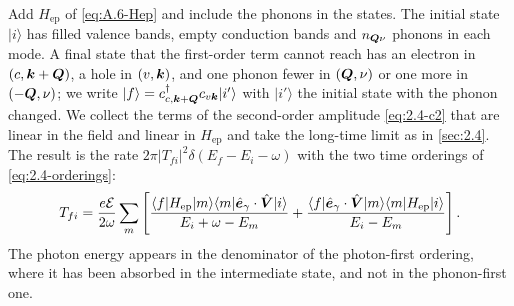 Add $H_{\mathrm{ep}}$ of \cref{eq:A.6-Hep} and include the phonons in the states. The initial state $|i\rangle$ has filled valence bands, empty conduction bands and $n_{\bm{Q}\nu}$ phonons in each mode. A final state that the first-order term cannot reach has an electron in $(c,\bm{k}+\bm{Q})$, a hole in $(v,\bm{k})$, and one phonon fewer in $(\bm{Q},\nu)$ or one more in $(-\bm{Q},\nu)$; we write $|f\rangle = c^\dagger_{c,\bm{k}+\bm{Q}}c_{v\bm{k}}|i'\rangle$ with $|i'\rangle$ the initial state with the phonon changed. We collect the terms of the second-order amplitude \cref{eq:2.4-c2} that are linear in the field and linear in $H_{\mathrm{ep}}$ and take the long-time limit as in \cref{sec:2.4}. The result is the rate $2\pi|T_{fi}|^2\delta(E_f - E_i - \omega)$ with the two time orderings of \cref{eq:2.4-orderings}:
\begin{equation*}
  T_{fi} = \frac{e\mathcal{E}}{2\omega}\sum_m\left[\frac{\langle f|H_{\mathrm{ep}}|m\rangle\langle m|\hat{\bm{e}}_\gamma\cdot\hat{\bm{V}}|i\rangle}{E_i + \omega - E_m} + \frac{\langle f|\hat{\bm{e}}_\gamma\cdot\hat{\bm{V}}|m\rangle\langle m|H_{\mathrm{ep}}|i\rangle}{E_i - E_m}\right] .
\end{equation*}
The photon energy appears in the denominator of the photon-first ordering, where it has been absorbed in the intermediate state, and not in the phonon-first one.

